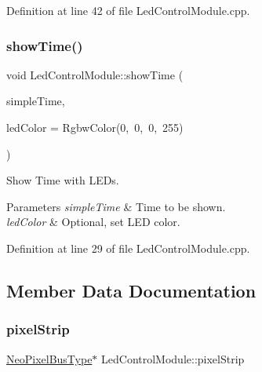 Definition at line 42 of file Led\+Control\+Module.\+cpp.

\mbox{\label{class_led_control_module_a873a4c44c95a7da2ca0665b0e69cf392}} 
\subsubsection{\texorpdfstring{showTime()}{showTime()}}
{\footnotesize\ttfamily void Led\+Control\+Module\+::show\+Time (\begin{DoxyParamCaption}\item[{const \mbox{\hyperlink{class_simple_time}{Simple\+Time}} \&}]{simple\+Time,  }\item[{const Rgbw\+Color \&}]{led\+Color = {\ttfamily RgbwColor(0,~0,~0,~255)} }\end{DoxyParamCaption})}



Show Time with L\+E\+Ds. 


\begin{DoxyParams}{Parameters}
{\em simple\+Time} & Time to be shown. \\
\hline
{\em led\+Color} & Optional, set L\+ED color. \\
\hline
\end{DoxyParams}


Definition at line 29 of file Led\+Control\+Module.\+cpp.



\subsection{Member Data Documentation}
\mbox{\label{class_led_control_module_a9d427e447c0cfb34b154f464e7682e14}} 
\subsubsection{\texorpdfstring{pixelStrip}{pixelStrip}}
{\footnotesize\ttfamily \mbox{\hyperlink{_led_control_module_8h_a51a7b766d62733fca1ec20e82e024f9f}{Neo\+Pixel\+Bus\+Type}}$\ast$ Led\+Control\+Module\+::pixel\+Strip\hspace{0.3cm}{\ttfamily [private]}}



